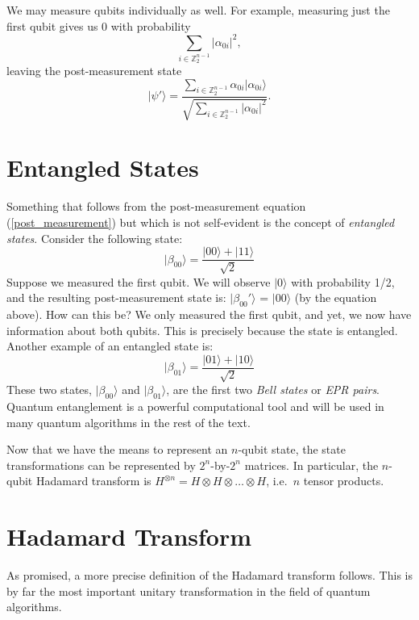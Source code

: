 \documentclass[12pt,twoside]{reedthesis}
\newcommand{\Z}{\mathbb{Z}}
\newcommand{\ket}[1]{\ensuremath{\lvert #1\rangle}\xspace}
\begin{document}
We may measure qubits individually as well. For example, measuring just the first qubit gives us 0 with probability 
\begin{equation*}
 \sum_{i \in \Z_2^{n-1}} \lvert \alpha_{0i} \rvert ^2,
\end{equation*}
leaving the post-measurement state
\begin{equation} \label{post_measurement}
 \ket{\psi'} = \frac{\sum_{i \in \Z_2^{n-1}} \alpha_{0i} \ket{\alpha_{0i}}}{\sqrt{\sum_{i \in \Z_2^{n-1}} \lvert \alpha_{0i} \rvert ^2}}.
\end{equation}

\section{Entangled States}

Something that follows from the post-measurement equation (\ref{post_measurement}) but which is not self-evident is the concept of \textit{entangled states}. Consider the following state:
\begin{equation*}
\ket{\beta_{00}} = \frac{\ket{00} + \ket{11}}{\sqrt{2}}
\end{equation*}
Suppose we measured the first qubit. We will observe \ket{0} with probability 1/2, and the resulting post-measurement state is: \ket{\beta_{00}'} = \ket{00} (by the equation above). How can this be? We only measured the first qubit, and yet, we now have information about both qubits. This is precisely because the state is entangled. Another example of an entangled state is:
\begin{equation*}
\ket{\beta_{01}} = \frac{\ket{01} + \ket{10}}{\sqrt{2}}
\end{equation*}
These two states, \ket{\beta_{00}} and \ket{\beta_{01}}, are the first two \textit{Bell states} or \textit{EPR pairs}. Quantum entanglement is a powerful computational tool and will be used in many quantum algorithms in the rest of the text. 

Now that we have the means to represent an $n$-qubit state, the state transformations can be represented by $2^n$-by-$2^n$ matrices. In particular, the $n$-qubit Hadamard transform is $H^{\otimes n} = H \otimes H \otimes \ldots \otimes H$, i.e.~$n$ tensor products.

\section{Hadamard Transform}

As promised, a more precise definition of the Hadamard transform follows. This is by far the most important unitary transformation in the field of quantum algorithms.
\end{document}
